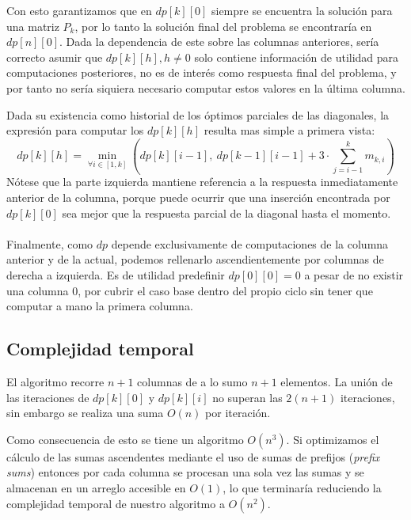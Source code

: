 \documentclass{article}
\theoremstyle{default}
\begin{document}
		Con esto garantizamos que en $dp[k][0]$ siempre se encuentra la solución para una matriz $P_k$, por lo tanto la solución final del problema se encontraría en $dp[n][0]$. Dada la dependencia de este sobre las columnas anteriores, sería correcto asumir que $dp[k][h], h \neq 0$ solo contiene información de utilidad para computaciones posteriores, no es de interés como respuesta final del problema, y por tanto no sería siquiera necesario computar estos valores en la última columna.

		Dada su existencia como historial de los óptimos parciales de las diagonales, la expresión para computar los $dp[k][h]$ resulta mas simple a primera vista:
		\begin{equation}
			\label{dp_h_all}
			dp[k][h] = \min_{\forall i \in [1,k]} \left(
				dp[k][i-1], \ dp[k-1][i-1]
				+ 3 \cdot \sum\limits_{j=i-1}^{k}m_{k,i}
				\right)
		\end{equation}
		Nótese que la parte izquierda mantiene referencia a la respuesta inmediatamente anterior de la columna, porque puede ocurrir que una inserción encontrada por $dp[k][0]$ sea mejor que la respuesta parcial de la diagonal hasta el momento.
		
		\paragraph{}Finalmente, como $dp$ depende exclusivamente de computaciones de la columna anterior y de la actual, podemos rellenarlo ascendientemente por columnas de derecha a izquierda. Es de utilidad predefinir $dp[0][0] = 0$ a pesar de no existir una columna $0$, por cubrir el caso base dentro del propio ciclo sin tener que computar a mano la primera columna.
	\subsection{Complejidad temporal}
		El algoritmo recorre $n+1$ columnas de a lo sumo $n+1$ elementos. La unión de las iteraciones de $dp[k][0]$ y $dp[k][i]$ no superan las $2(n+1)$ iteraciones, sin embargo se realiza una suma $O(n)$ por iteración.

		Como consecuencia de esto se tiene un algoritmo $O(n^3)$. Si optimizamos el cálculo de las sumas ascendentes mediante el uso de sumas de prefijos (\textit{prefix sums}) entonces por cada columna se procesan una sola vez las sumas y se almacenan en un arreglo accesible en $O(1)$, lo que terminaría reduciendo la complejidad temporal de nuestro algoritmo a $O(n^2)$.
\end{document}
